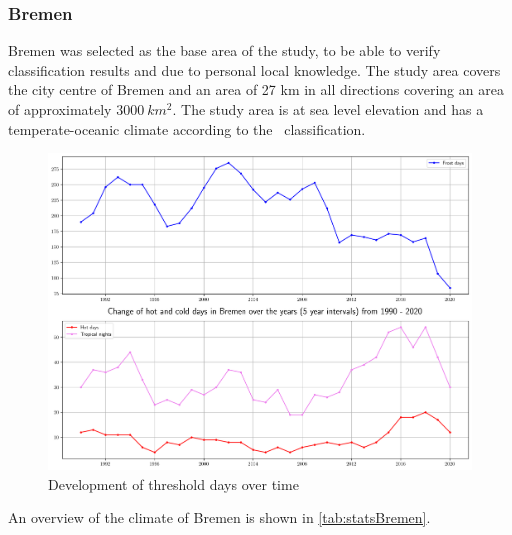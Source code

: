 \documentclass[12pt,a4paper, english]{article}
\begin{document}
  \subsubsection{Bremen}
  Bremen was selected as the base area of the study, to be able to verify classification results and due to personal local knowledge. 
  The study area covers the city centre of Bremen and an area of 27 km in all directions covering an area of approximately $3000\ km^2$. 
  The study area is at sea level elevation and has a temperate-oceanic climate according to the~\autocite{koppen1930handbuch} classification.%
    \begin{figure}[!htbp]
     \centering
        \includegraphics[width=\textwidth]{img/BremenKIChanges}
        \caption{Development of threshold days over time\label{fig:climateovertimeBremen}}
   \end{figure}
   An overview of the climate of Bremen is shown in \cref{tab:statsBremen}.
\end{document}
